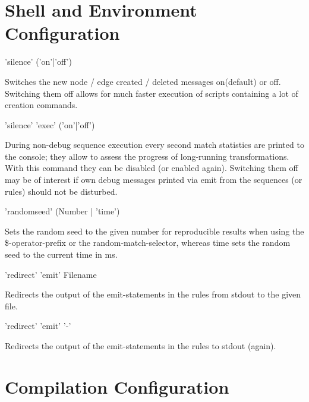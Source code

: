 \section{Shell and Environment Configuration}

\begin{rail}
'silence' ('on'|'off')
\end{rail}
Switches the new node / edge created / deleted messages on(default) or off.
Switching them off allows for much faster execution of scripts containing a lot of creation commands.

\begin{rail}
'silence' 'exec' ('on'|'off')
\end{rail}
During non-debug sequence execution every second match statistics are printed to the console;
they allow to assess the progress of long-running transformations.
With this command they can be disabled (or enabled again).
Switching them off may be of interest if own debug messages printed via emit from the sequences (or rules) should not be disturbed.

\begin{rail}
'randomseed' (Number | 'time')
\end{rail}
Sets the random seed to the given number for reproducible results when using the \$-operator-prefix or the random-match-selector, whereas time sets the random seed to the current time in ms.

\begin{rail}
'redirect' 'emit' Filename
\end{rail}
Redirects the output of the emit-statements in the rules from stdout to the given file.

\begin{rail}
'redirect' 'emit' '-'
\end{rail}
Redirects the output of the emit-statements in the rules to stdout (again).


\section{Compilation Configuration}\label{sec:compilerconfigshell}

